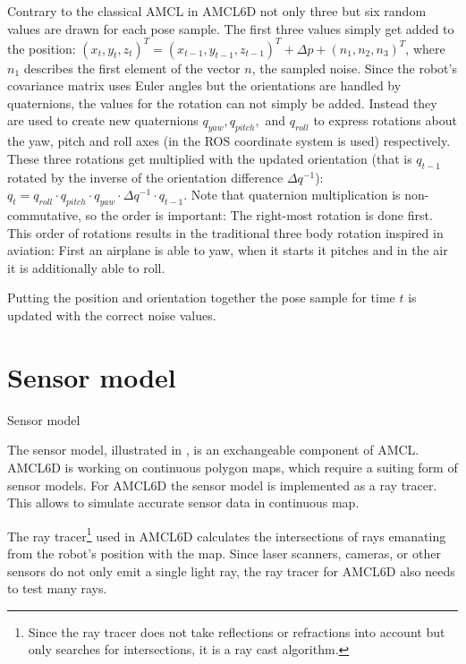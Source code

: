 \documentclass[Thesis.tex]{subfiles}
\begin{document}
Contrary to the classical \gls{AMCL} in \gls{AMCL6D} not only three but six random values are drawn for each pose sample. The first three values simply get added to the position: $(x_t, y_t, z_t)^T = (x_{t-1}, y_{t-1}, z_{t-1})^T + \Delta p + (n_1, n_2, n_3)^T$, where $n_1$ describes the first element of the vector $n$, the sampled noise.
Since the robot's covariance matrix uses Euler angles but the orientations are handled by quaternions, the values for the rotation can not simply be added. Instead they are used to create new quaternions $q_{yaw}, q_{pitch},$ and $q_{roll}$ to express rotations about the yaw, pitch and roll axes (in  the \gls{ROS} coordinate system is used) respectively. These three rotations get multiplied with the updated orientation (that is $q_{t-1}$ rotated by the inverse of the orientation difference $\Delta q^{-1}$): $q_{t} = q_{roll} \cdot q_{pitch} \cdot q_{yaw} \cdot \Delta q^{-1} \cdot q_{t-1}$. Note that quaternion multiplication is non-commutative, so the order is important: The right-most rotation is done first. This order of rotations results in the traditional three body rotation inspired in aviation: First an airplane is able to yaw, when it starts it pitches and in the air it is additionally able to roll.

Putting the position and orientation together the pose sample for time $t$ is updated with the correct noise values.
%
%
%
%
%
%
\section{Sensor model}
%
\begin{algorithm}[!htp]
\caption{Sensor model}
\label{alg:sensormodel}

\end{algorithm}
%
The sensor model, illustrated in , is an exchangeable component of \gls{AMCL}. \gls{AMCL6D} is working on continuous polygon maps, which require a suiting form of sensor models. For \gls{AMCL6D} the sensor model is implemented as a ray tracer. This allows to simulate accurate sensor data in continuous map. 

The ray tracer\footnote{Since the ray tracer does not take reflections or refractions into account but only searches for intersections, it is a ray cast algorithm.} used in \gls{AMCL6D} calculates the intersections of rays emanating from the robot's position with the map. Since laser scanners, cameras, or other sensors do not only emit a single light ray, the ray tracer for \gls{AMCL6D} also needs to test many rays. 
\end{document}
